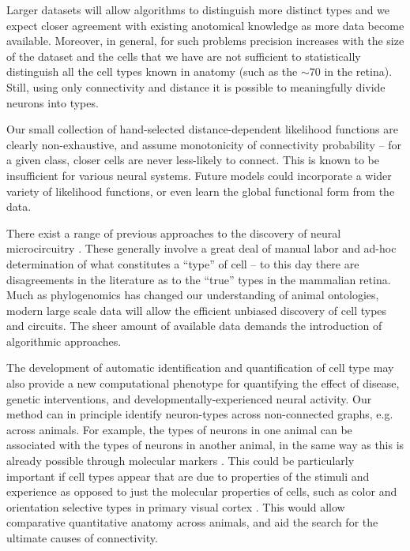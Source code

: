 \documentclass{article}
\begin{document}
  Larger datasets will allow algorithms to distinguish more distinct
  types  and we expect closer agreement
  with existing anotomical knowledge as more data become available.
  Moreover, in general, for such problems precision increases with the
  size of the dataset and the cells that we have are not sufficient to
  statistically distinguish all the cell types known in anatomy (such
  as the $\sim 70$ in the retina). Still, using only connectivity and
  distance it is possible to meaningfully divide neurons into types.

Our small collection of hand-selected distance-dependent likelihood
functions are clearly non-exhaustive, and assume monotonicity
of connectivity probability -- for a given class, closer cells
are never less-likely to connect. This is known to be insufficient
for various neural systems. Future models could incorporate
a wider variety of likelihood functions, or even learn the global
functional form from the data. 

There exist a range of previous approaches to the discovery of
neural microcircuitry . These
generally involve a great deal of manual labor and ad-hoc
determination of what constitutes a “type” of cell -- to this day
there are disagreements in the literature as to the “true” types in
the mammalian retina. Much as phylogenomics has changed our
understanding of animal ontologies, modern large scale data will allow
the efficient unbiased discovery of cell types and circuits. The sheer
amount of available data demands the introduction of algorithmic
approaches.

The development of automatic identification and quantification of cell
type may also provide a new computational phenotype for quantifying
the effect of disease, genetic interventions, and
developmentally-experienced neural activity. Our method can in
principle identify neuron-types across non-connected graphs,
e.g. across animals. For example, the types of neurons in one animal
can be associated with the types of neurons in another animal, in the
same way as this is already possible through molecular markers
\autocite{Brown2009}. This could be particularly important if cell
types appear that are due to properties of the stimuli and experience
as opposed to just the molecular properties of cells, such as color
and orientation selective types in primary visual cortex
\autocite{Sincich2005,Lennie2005}. This would allow comparative
quantitative anatomy across animals, and aid the search for the
ultimate causes of connectivity.
\end{document}
